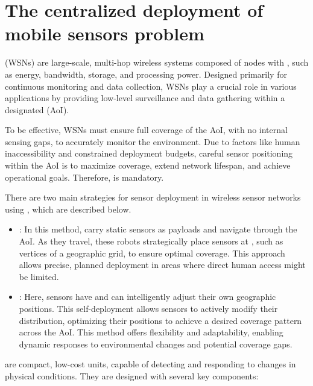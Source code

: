 \documentclass[a4paper, 12pt]{report}
\begin{document}
    \chapter{The centralized deployment of mobile sensors problem}

     (WSNs) are large-scale, multi-hop wireless systems composed of nodes with , such as energy, bandwidth, storage, and processing power. Designed primarily for continuous monitoring and data collection, WSNs play a crucial role in various applications by providing low-level surveillance and data gathering within a designated  (AoI). 

    To be effective, WSNs must ensure full coverage of the AoI, with no internal sensing gaps, to accurately monitor the environment. Due to factors like human inaccessibility and constrained deployment budgets, careful sensor positioning within the AoI is  to maximize coverage, extend network lifespan, and achieve operational goals. Therefore,  is mandatory.

    There are two main strategies for sensor deployment in wireless sensor networks using , which are described below.

    \begin{itemize}
        \item {}: In this method,  carry static sensors as payloads and navigate through the AoI. As they travel, these robots strategically place sensors at , such as vertices of a geographic grid, to ensure optimal coverage. This approach allows precise, planned deployment in areas where direct human access might be limited.
        \item {}: Here, sensors have  and can intelligently adjust their own geographic positions. This self-deployment allows sensors to actively modify their distribution, optimizing their positions to achieve a desired coverage pattern across the AoI. This method offers flexibility and adaptability, enabling dynamic responses to environmental changes and potential coverage gaps.
    \end{itemize}

     are compact, low-cost units, capable of detecting and responding to changes in physical conditions. They are designed with several key components:
\end{document}
